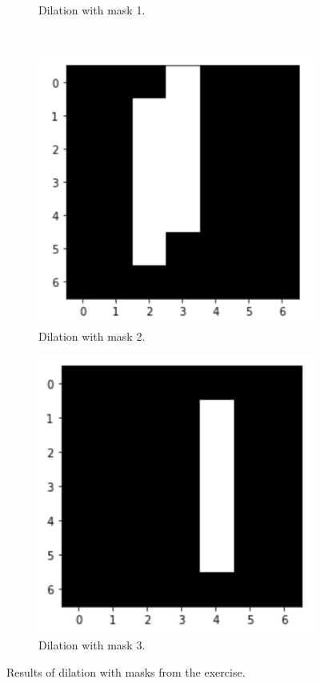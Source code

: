 \begin{figure}[H]
\begin{subfigure}[b]{0.45\textwidth}
		\caption{Dilation with mask 1.}
		\label{m1res}
	\end{subfigure}
	\hfill
	\\
	\begin{subfigure}[b]{0.45\textwidth}
		\centering
		\includegraphics[width=\textwidth]{Materials/m2res}
		\caption{Dilation with mask 2.}
		\label{m2res}
	\end{subfigure}
	\hfill
	\begin{subfigure}[b]{0.45\textwidth}
		\centering
		\includegraphics[width=\textwidth]{Materials/m3res}
		\caption{Dilation with mask 3.}
		\label{m3res}
	\end{subfigure}
	\caption{Results of dilation with masks from the exercise.}
\end{figure}
